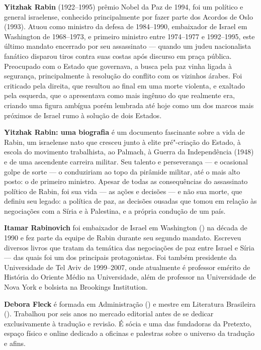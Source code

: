 \textbf{Yitzhak Rabin} (1922--1995) prêmio Nobel da Paz de 1994, foi um político e general israelense, conhecido principalmente por fazer parte dos Acordos de Oslo (1993). Atuou como ministro da defesa de 1984--1990, embaixador de Israel em Washington de 1968--1973, e primeiro ministro entre 1974--1977 e 1992--1995, este último mandato encerrado por seu assassinato --- quando um judeu nacionalista fanático disparou tiros contra suas costas após discurso em praça pública. Preocupado com o Estado que governava, a busca pela paz vinha ligada à segurança, principalmente à resolução do conflito com os vizinhos árabes. Foi criticado pela direita, que resultou ao final em uma morte violenta, e exaltado pela esquerda, que o apresentava como mais ingênuo do que realmente era, criando uma figura ambígua porém lembrada até hoje como um dos marcos mais próximos de Israel rumo à solução de dois Estados.

\textbf{Yitzhak Rabin: uma biografia} é um documento fascinante sobre a vida de Rabin, um israelense nato que cresceu junto à elite pré"-criação do Estado, à escola do movimento trabalhista, ao Palmach, à Guerra da Independência (1948) e de uma ascendente carreira militar. Seu talento e perseverança --- e ocasional golpe de sorte --- o conduziriam ao topo da pirâmide militar, até o mais alto posto: o de primeiro ministro. Apesar de todas as consequências do assassinato político de Rabin, foi sua vida --- as ações e decisões --- e não sua morte, que definiu seu legado: a política de paz, as decisões ousadas que tomou em relação às negociações com a Síria e à Palestina, e a própria condução de um país.

\textbf{Itamar Rabinovich} foi embaixador de Israel em Washington () na década de 1990 e fez parte da equipe de Rabin durante seu segundo mandato. Escreveu diversos livros que tratam da temática das negociações de paz entre Israel e Síria --- das quais foi um dos principais protagonistas. Foi também presidente da Universidade de Tel Aviv de 1999--2007, onde atualmente é professor emérito de História do Oriente Médio na Universidade, além de professor na Universidade de Nova York e bolsista na Brookings Institution.

\textbf{Debora Fleck} é formada em Administração () e mestre em Literatura Brasileira (). Trabalhou por seis anos no mercado editorial antes de se dedicar exclusivamente à tradução e revisão. É sócia e uma das fundadoras da Pretexto, espaço físico e online dedicado a oficinas e palestras sobre o universo da tradução e afins.

